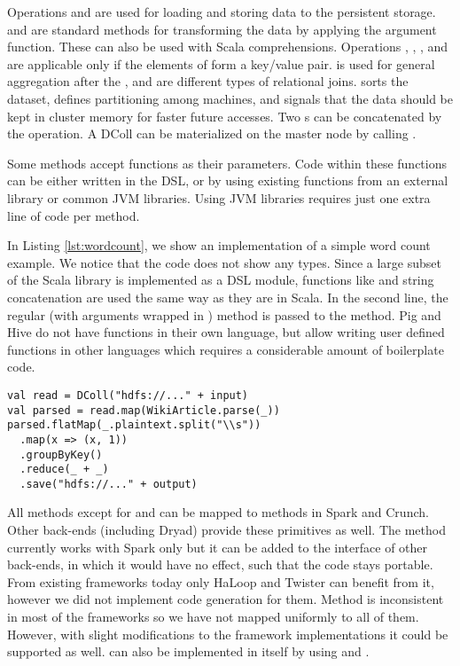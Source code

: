 Operations  and  are used for loading and storing data
to the persistent storage.  and  are standard
methods for transforming the data by applying the argument function. These can
also be used with Scala  comprehensions. Operations
, , ,  and 
are applicable only if the elements of  form a key/value pair.
 is used for general aggregation after the ,
 and  are different types of relational joins.
 sorts the dataset,  defines partitioning among
machines, and  signals that the data should be kept in cluster
memory for faster future accesses. Two s can be concatenated by the
\code{++} operation. A DColl can be materialized on the master node by calling
.

Some methods accept functions as their parameters. Code within these functions
can be either written in the \tool DSL, or by using existing functions from an
external library or common JVM libraries. Using JVM libraries requires just one
extra line of code per method.

In Listing \ref{lst:wordcount}, we show an implementation of a simple word count
example. We notice that the code does not show any  types.
Since a large subset of the Scala library is implemented as a DSL module, functions like
 and string concatenation are used the same way as they are in
Scala. In the second line, the regular (with arguments wrapped in )
method  is passed to the  method. Pig and Hive do not have
functions in their own language, but allow writing user defined functions in
other languages which requires a considerable amount of boilerplate code.

\begin{lstlisting}[name=code, caption=An example of a simple word count
program., captionpos=b, label=lst:wordcount, float=t] 
val read = DColl("hdfs://..." + input)
val parsed = read.map(WikiArticle.parse(_))
parsed.flatMap(_.plaintext.split("\\s"))
  .map(x => (x, 1))
  .groupByKey()
  .reduce(_ + _)
  .save("hdfs://..." + output)
\end{lstlisting}

All methods except for  and  can be mapped to methods in
Spark and Crunch. Other back-ends (including Dryad) provide these
primitives as well. The  method currently works with Spark only but
it can be added to the interface of other back-ends, in which it would have no
effect, such that the code stays portable. From existing frameworks today only
HaLoop \cite{bu_haloop:_2010} and Twister \cite{ekanayake_twister:_2010} can
benefit from it, however we did not implement code generation for them. Method
 is inconsistent in most of the frameworks so we have not mapped
uniformly to all of them. However, with slight modifications to the framework
implementations it could be supported as well.  can also be
implemented in \tool itself by using  and .
